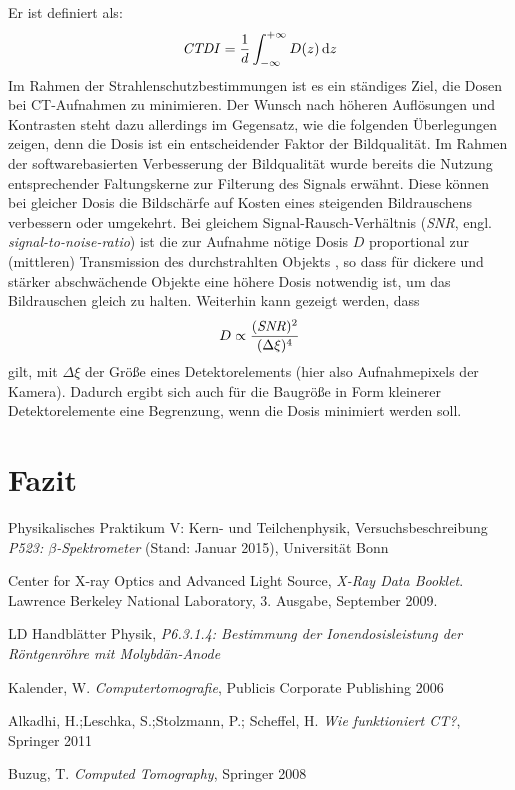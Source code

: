 \documentclass[11pt, a4paper]{article}
\numberwithin{equation}{section}
\begin{document}
Er ist definiert als:
\begin{align}
	\text{\emph{CTDI}}=\frac{1}{d}\int_{-\infty}^{+\infty}D(z)\,\mathrm{d}z
\end{align}
Im Rahmen der Strahlenschutzbestimmungen ist es ein ständiges Ziel, die Dosen bei CT-Aufnahmen zu minimieren.
Der Wunsch nach höheren Auflösungen und Kontrasten steht dazu allerdings im Gegensatz, wie die folgenden Überlegungen zeigen, denn die Dosis ist ein entscheidender Faktor der Bildqualität.
Im Rahmen der softwarebasierten Verbesserung der Bildqualität wurde bereits die Nutzung entsprechender Faltungskerne zur Filterung des Signals erwähnt.
Diese können bei gleicher Dosis die Bildschärfe auf Kosten eines steigenden Bildrauschens verbessern oder umgekehrt.
Bei gleichem Signal-Rausch-Verhältnis (\emph{SNR}, engl. \emph{signal-to-noise-ratio}) ist die zur Aufnahme nötige Dosis $D$ proportional zur (mittleren) Transmission des durchstrahlten Objekts \cite{buzug}, so dass für dickere und stärker abschwächende Objekte eine höhere Dosis notwendig ist, um das Bildrauschen gleich zu halten. 
Weiterhin kann gezeigt werden, dass
\begin{align}
	D \propto \frac{(\text{\emph{SNR}})^2}{(\Delta\xi)^4}
\end{align}
gilt, mit $\Delta\xi$ der Größe eines Detektorelements (hier also Aufnahmepixels der Kamera).
Dadurch ergibt sich auch für die Baugröße in Form kleinerer Detektorelemente eine Begrenzung, wenn die Dosis minimiert werden soll.
\section{Fazit}

\FloatBarrier
\vspace{\fill}
\begin{thebibliography}{19}
	Physikalisches Praktikum V: Kern- und Teilchenphysik,
	Versuchsbeschreibung \emph{P523: $\beta$-Spektrometer} (Stand: Januar 2015),
	Universität Bonn	

	Center for X-ray Optics and Advanced Light Source,
	\emph{X-Ray Data Booklet}.
	Lawrence Berkeley National Laboratory,
	3. Ausgabe,
	September 2009.

	LD Handblätter Physik,
	\emph{P6.3.1.4: Bestimmung der Ionendosisleistung der Röntgenröhre mit Molybdän-Anode}
	
	Kalender, W.
	\emph{Computertomografie},
	Publicis Corporate Publishing 2006
	
	Alkadhi, H.;Leschka, S.;Stolzmann, P.; Scheffel, H.
	\emph{Wie funktioniert CT?},
	Springer 2011
	
	Buzug, T.
	\emph{Computed Tomography},
	Springer 2008

\end{thebibliography}
\end{document}

